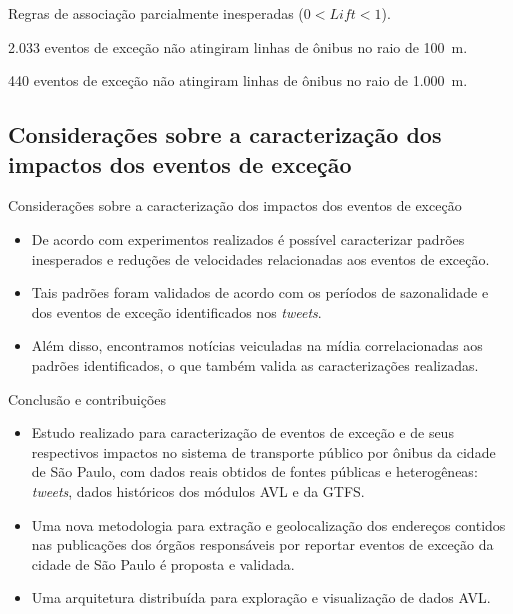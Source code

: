 \documentclass{beamer}
\begin{document}
\begin{frame}
\begin{table}[!htb]
\begin{adjustbox}{max height=10mm, width=3in}
\begin{threeparttable}
\begin{tablenotes}
            \item[e] Regras de associação parcialmente inesperadas ($0 < Lift < 1$).
            \item[f] 2.033 eventos de exceção não atingiram linhas de ônibus no raio de 100~m.
            \item[g] 440 eventos de exceção não atingiram linhas de ônibus no raio de 1.000~m.
        \end{tablenotes}
\end{threeparttable}
\end{adjustbox}
\end{table}
\end{frame}
\subsection{Considerações sobre a caracterização dos impactos dos eventos de exceção}\begin{frame}{Considerações sobre a caracterização dos impactos dos eventos de exceção}
\begin{itemize}
\item De acordo com experimentos realizados é possível caracterizar padrões inesperados e reduções de velocidades relacionadas aos eventos de exceção. 
\item Tais padrões foram validados de acordo com os períodos de sazonalidade e dos eventos de exceção identificados nos \textit{tweets}. 
\item Além disso, encontramos notícias veiculadas na mídia correlacionadas aos padrões identificados, o que também valida as caracterizações realizadas.
\end{itemize}
\end{frame}
\begin{frame}{Conclusão e contribuições}
\begin{itemize}
\item Estudo realizado para caracterização de eventos de exceção e de seus respectivos impactos no sistema de transporte público por ônibus da cidade de São Paulo, com dados reais obtidos de fontes públicas e heterogêneas:  \textit{tweets}, dados históricos dos módulos AVL e da GTFS.
\item Uma nova metodologia para extração e geolocalização dos endereços contidos nas publicações dos órgãos responsáveis por reportar eventos de exceção da cidade de São Paulo é proposta e validada.
\item Uma arquitetura distribuída para exploração e visualização de dados AVL.
\end{itemize}
\end{frame}
\end{document}
